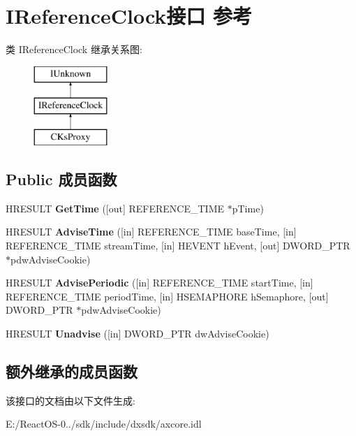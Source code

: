 \hypertarget{interface_i_reference_clock}{}\section{I\+Reference\+Clock接口 参考}
\label{interface_i_reference_clock}
类 I\+Reference\+Clock 继承关系图\+:\begin{figure}[H]
\begin{center}
\leavevmode
\includegraphics[height=3.000000cm]{interface_i_reference_clock}
\end{center}
\end{figure}
\subsection*{Public 成员函数}
\begin{DoxyCompactItemize}
\item 
\mbox{\label{interface_i_reference_clock_a02e92bed31b3fd3b44148c9c394138bc}} 
H\+R\+E\+S\+U\+LT {\bfseries Get\+Time} (\mbox{[}out\mbox{]} R\+E\+F\+E\+R\+E\+N\+C\+E\+\_\+\+T\+I\+ME $\ast$p\+Time)
\item 
\mbox{\label{interface_i_reference_clock_a5fa5550ed50390633294e6c3d143a469}} 
H\+R\+E\+S\+U\+LT {\bfseries Advise\+Time} (\mbox{[}in\mbox{]} R\+E\+F\+E\+R\+E\+N\+C\+E\+\_\+\+T\+I\+ME base\+Time, \mbox{[}in\mbox{]} R\+E\+F\+E\+R\+E\+N\+C\+E\+\_\+\+T\+I\+ME stream\+Time, \mbox{[}in\mbox{]} H\+E\+V\+E\+NT h\+Event, \mbox{[}out\mbox{]} D\+W\+O\+R\+D\+\_\+\+P\+TR $\ast$pdw\+Advise\+Cookie)
\item 
\mbox{\label{interface_i_reference_clock_add8707074584f4054283430132467a2d}} 
H\+R\+E\+S\+U\+LT {\bfseries Advise\+Periodic} (\mbox{[}in\mbox{]} R\+E\+F\+E\+R\+E\+N\+C\+E\+\_\+\+T\+I\+ME start\+Time, \mbox{[}in\mbox{]} R\+E\+F\+E\+R\+E\+N\+C\+E\+\_\+\+T\+I\+ME period\+Time, \mbox{[}in\mbox{]} H\+S\+E\+M\+A\+P\+H\+O\+RE h\+Semaphore, \mbox{[}out\mbox{]} D\+W\+O\+R\+D\+\_\+\+P\+TR $\ast$pdw\+Advise\+Cookie)
\item 
\mbox{\label{interface_i_reference_clock_aa112589ee1181eead6c0dc08f118d406}} 
H\+R\+E\+S\+U\+LT {\bfseries Unadvise} (\mbox{[}in\mbox{]} D\+W\+O\+R\+D\+\_\+\+P\+TR dw\+Advise\+Cookie)
\end{DoxyCompactItemize}
\subsection*{额外继承的成员函数}


该接口的文档由以下文件生成\+:\begin{DoxyCompactItemize}
\item 
E\+:/\+React\+O\+S-\/0../sdk/include/dxsdk/axcore.\+idl\end{DoxyCompactItemize}
